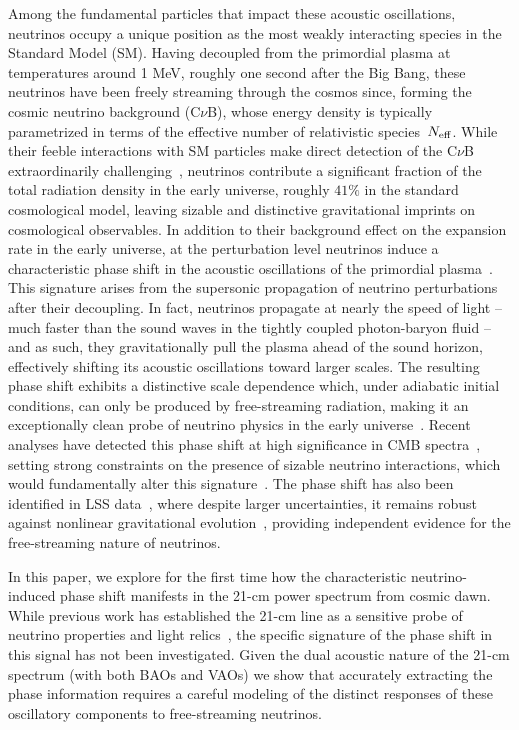 \documentclass[floats,floatfix,showpacs,amssymb,prd,twocolumn,superscriptaddress,nofootinbib,reprint,preprintnumbers]{revtex4-2}
\begin{document}
Among the fundamental particles that impact these acoustic oscillations, neutrinos occupy a unique position as the most weakly interacting species in the Standard Model (SM).  Having decoupled from the primordial plasma at temperatures around 1 MeV, roughly one second after the Big Bang, these neutrinos have been freely streaming through the cosmos since, forming the cosmic neutrino background (C$\nu$B), whose energy density is typically parametrized in terms of the effective number of relativistic species~$N_{\rm eff}$. While their feeble interactions with SM particles make direct detection of the C$\nu$B extraordinarily challenging~\cite{Bauer:2022lri,PTOLEMY:2019hkd}, neutrinos contribute a significant fraction of the total radiation density in the early universe, roughly $41\%$ in the standard cosmological model,  leaving sizable and distinctive gravitational imprints on cosmological observables. In addition to their background effect on the expansion rate in the early universe, at the perturbation level neutrinos induce a characteristic phase shift in the acoustic oscillations of the primordial plasma~\citep{Bashinsky:2003tk}. This signature arises from the supersonic propagation of neutrino perturbations after their decoupling. In fact, neutrinos propagate  at nearly the speed of light -- much faster than the sound waves in the tightly coupled photon-baryon fluid -- and as such, they gravitationally pull the plasma ahead of the sound horizon, effectively shifting its acoustic oscillations toward larger scales. The resulting phase shift exhibits a distinctive scale dependence which, under adiabatic initial conditions, can only be produced by free-streaming radiation, making it an exceptionally clean probe of neutrino physics in the early universe~\citep{Baumann:2015rya}. Recent analyses have detected this phase shift at high significance in CMB spectra~\citep{Follin:2015hya,Baumann:2015rya,Montefalcone:2025unv,montefalcone25}, setting strong constraints on the presence of sizable neutrino interactions, which would fundamentally alter this signature~\citep{Choi:2018gho,montefalcone25}. The phase shift has also been identified in LSS data~\citep{Baumann:2017gkg,Baumann:2019keh}, where despite larger uncertainties, it remains robust against nonlinear gravitational evolution~\citep{Baumann:2017lmt}, providing independent evidence for the free-streaming nature of neutrinos.


In this paper, we explore for the first time how the characteristic neutrino-induced phase shift manifests in the 21-cm power spectrum from cosmic dawn. While previous work has established the 21-cm line as a sensitive probe of neutrino properties and light relics~\citep{Lee:2023uxu,Dey:2022ini,Plombat:2024kla,Dhuria:2024zwh,Libanore:2025ack}, the specific signature of the phase shift in this signal has not been investigated. Given the dual acoustic nature of the 21-cm spectrum (with both BAOs and VAOs) we show that accurately extracting the phase information requires a careful modeling of the distinct responses of these oscillatory components to free-streaming neutrinos. 
\end{document}
